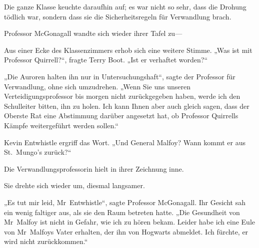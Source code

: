 Die ganze Klasse keuchte daraufhin auf; es war nicht so sehr, dass die Drohung tödlich war, sondern dass sie die Sicherheitsregeln für Verwandlung brach.

Professor McGonagall wandte sich wieder ihrer Tafel zu—

Aus einer Ecke des Klassenzimmers erhob sich eine weitere Stimme. „Was ist mit Professor Quirrell?“, fragte Terry Boot. „Ist er verhaftet worden?“

„Die Auroren halten ihn nur in Untersuchungshaft“, sagte der Professor für Verwandlung, ohne sich umzudrehen. „Wenn Sie uns unseren Verteidigungsprofessor bis morgen nicht zurückgegeben haben, werde ich den Schulleiter bitten, ihn zu holen. Ich kann Ihnen aber auch gleich sagen, dass der Oberste Rat eine Abstimmung darüber angesetzt hat, ob Professor Quirrells Kämpfe weitergeführt werden sollen.“

Kevin Entwhistle ergriff das Wort. „Und General Malfoy? Wann kommt er aus St.~Mungo’s zurück?“

Die Verwandlungsprofessorin hielt in ihrer Zeichnung inne.

Sie drehte sich wieder um, diesmal langsamer.

„Es tut mir leid, Mr~Entwhistle“, sagte Professor McGonagall. Ihr Gesicht sah ein wenig faltiger aus, als sie den Raum betreten hatte. „Die Gesundheit von Mr~Malfoy ist nicht in Gefahr, wie ich zu hören bekam. Leider habe ich eine Eule von Mr~Malfoys Vater erhalten, der ihn von Hogwarts abmeldet. Ich fürchte, er wird nicht zurückkommen.“
